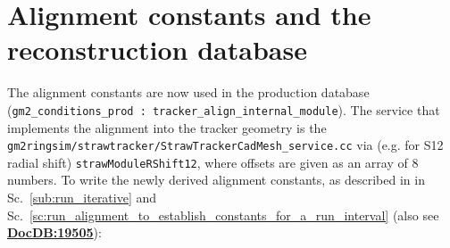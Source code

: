 \documentclass[12pt]{article}
\begin{document}
\section{Alignment constants and the reconstruction database}
The alignment constants are now used in the production database \\ (\verb!gm2_conditions_prod : tracker_align_internal_module!). The service that implements the alignment into the tracker geometry is the \\ \verb!gm2ringsim/strawtracker/StrawTrackerCadMesh_service.cc! via (e.g. for S12 radial shift) \verb!strawModuleRShift12!, where offsets are given as an array of 8 numbers. To write the newly derived alignment constants, as described in in Sc.~\ref{sub:run_iterative} and Sc.~\ref{sc:run_alignment_to_establish_constants_for_a_run_interval} (also see \textbf{\href{https://gm2-docdb.fnal.gov/cgi-bin/private/ShowDocument?docid=19505}{DocDB:19505}}):
\end{document}
